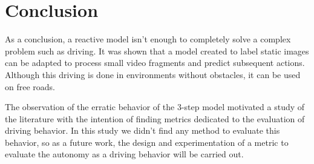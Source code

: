 \documentclass[conference]{IEEEtran}
\begin{document}
\section{Conclusion}

As a conclusion, a reactive model isn't enough to completely solve a complex problem such as driving. It was shown that a model created to label static images can be adapted to process small video fragments and predict subsequent actions. Although this driving is done in environments without obstacles, it can be used on free roads.

The observation of the erratic behavior of the 3-step model motivated a study of the literature with the intention of finding metrics dedicated to the evaluation of driving behavior. In this study we didn't find any method to evaluate this behavior, so as a future work, the design and experimentation of a metric to evaluate the autonomy as a driving behavior will be carried out. 



\printbibliography
\end{document}
